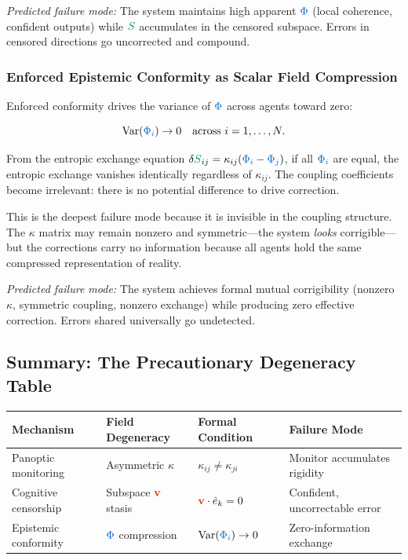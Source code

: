 \documentclass[11pt,a4paper]{article}
\newcommand{\scalar}[1]{\textcolor{scalarcolor}{\ensuremath{#1}}}
\newcommand{\vect}[1]{\textcolor{vectorcolor}{\ensuremath{\mathbf{#1}}}}
\newcommand{\entropy}[1]{\textcolor{entropycolor}{\ensuremath{#1}}}
\theoremstyle{definition}
\theoremstyle{plain}
\begin{document}
\textit{Predicted failure mode:} The system maintains high apparent $\scalar{\Phi}$ (local coherence, confident outputs) while $\entropy{S}$ accumulates in the censored subspace. Errors in censored directions go uncorrected and compound.

\subsubsection{Enforced Epistemic Conformity as Scalar Field Compression}

Enforced conformity drives the variance of $\scalar{\Phi}$ across agents toward zero:

\begin{equation}
\text{Var}(\scalar{\Phi_i}) \to 0 \quad \text{across } i = 1, \ldots, N.
\end{equation}

From the entropic exchange equation $\delta \entropy{S}_{ij} = \kappa_{ij}(\scalar{\Phi_i} - \scalar{\Phi_j})$, if all $\scalar{\Phi_i}$ are equal, the entropic exchange vanishes identically regardless of $\kappa_{ij}$. The coupling coefficients become irrelevant: there is no potential difference to drive correction.

This is the deepest failure mode because it is invisible in the coupling structure. The $\kappa$ matrix may remain nonzero and symmetric---the system \emph{looks} corrigible---but the corrections carry no information because all agents hold the same compressed representation of reality.

\textit{Predicted failure mode:} The system achieves formal mutual corrigibility (nonzero $\kappa$, symmetric coupling, nonzero exchange) while producing zero effective correction. Errors shared universally go undetected.

\subsection{Summary: The Precautionary Degeneracy Table}

{\small
\begin{center}
\begin{tabularx}{\linewidth}{lllX}
\toprule
\textbf{Mechanism} & \textbf{Field Degeneracy} & \textbf{Formal Condition} & \textbf{Failure Mode} \\
\midrule
Panoptic monitoring & Asymmetric $\kappa$ & $\kappa_{ij} \neq \kappa_{ji}$ & Monitor accumulates rigidity \\
Cognitive censorship & Subspace $\vect{v}$ stasis & $\vect{v} \cdot \hat{e}_k = 0$ & Confident, uncorrectable error \\
Epistemic conformity & $\scalar{\Phi}$ compression & $\mathrm{Var}(\scalar{\Phi_i}) \to 0$ & Zero-information exchange \\
\bottomrule
\end{tabularx}
\end{center}
}
\end{document}
